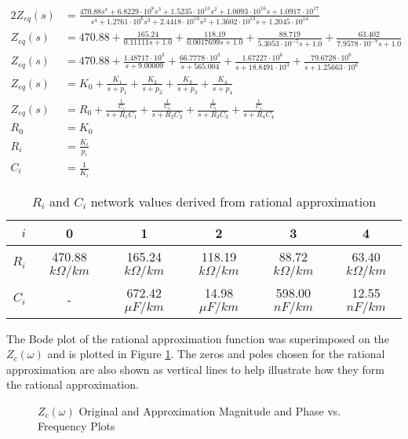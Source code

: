 \documentclass[10pt, oneside, letterpaper]{article}
\begin{document}
\begin{alignat}{2}
Z_{eq}(s) &= \frac{470.88 s^{4} + 6.8229 \cdot 10^{8} s^{3} + 1.5235 \cdot 10^{13} s^{2} + 1.0093 \cdot 10^{16} s + 1.0917 \cdot 10^{17}}{s^{4} + 1.2761 \cdot 10^{6} s^{3} + 2.4418 \cdot 10^{10} s^{2} + 1.3602 \cdot 10^{13} s + 1.2045 \cdot 10^{14}} \\
Z_{eq}(s) &= 470.88 + \frac{165.24}{0.11111 s + 1.0} + \frac{118.19}{0.0017699 s + 1.0} + \frac{88.719}{5.3053 \cdot 10^{-5} s + 1.0} + \frac{63.402}{7.9578 \cdot 10^{-7} s + 1.0} \\
Z_{eq}(s) &= 470.88 + \frac{1.48717\cdot 10^{3}}{s + 9.00009} + \frac{66.7778\cdot 10^{3}}{s + 565.004} + \frac{1.67227\cdot 10^{6}}{s + 18.8491\cdot 10^{3}} + \frac{79.6728\cdot 10^{6}}{s + 1.25663\cdot 10^{6}} \\
Z_{eq}(s) &= K_0 + \frac{K_1}{s + p_1} + \frac{K_2}{s + p_2} + \frac{K_3}{s + p_3} + \frac{K_4}{s + p_4} \\
Z_{eq}(s) &= R_0 + \frac{\frac{1}{C_1}}{s + R_1C_1} + \frac{\frac{1}{C_2}}{s + R_2C_2} + \frac{\frac{1}{C_3}}{s + R_3C_3} + \frac{\frac{1}{C_4}}{s + R_4C_4} \\
R_0 &= K_0 \\
R_i &= \frac{K_i}{p_i} \\
C_i &= \frac{1}{K_i}
\end{alignat}

\begin{table}[H]
\centering
\begin{tabular}{r|c|c|c|c|c}
$i$    & 0   & 1   & 2   & 3     & 4 \\ \hline
$R_i$ & 470.88 $k\Omega{}/km$ & 165.24 $k\Omega{}/km$ & 118.19 $k\Omega{}/km$ & 88.72 $k\Omega{}/km$ & 63.40 $k\Omega{}/km$ \\ \hline
$C_i$ & - & 672.42 $\mu{}F/km$ & 14.98 $\mu{}F/km$ & 598.00 $nF/km$ & 12.55 $nF/km$ 
\end{tabular}
\caption{$R_i$ and $C_i$ network values derived from rational approximation}
\label{tab:rc-results}
\end{table}

The Bode plot of the rational approximation function was superimposed on the $Z_c(\omega{})$ and is plotted in Figure \ref{zc_plots}. The zeros and poles chosen for the rational approximation are also shown as vertical lines to help illustrate how they form the rational approximation.

\begin{figure}[H]
    \begin{center}
        
    \end{center}
    \caption{$Z_c(\omega{})$ Original and Approximation Magnitude and Phase vs. Frequency Plots}
    \label{zc_plots}
\end{figure}
\end{document}
